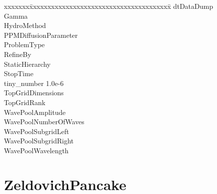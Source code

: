 \documentclass{book}
\begin{document}
{\parametersize
\begin{tabbing}
xxxxxxx\=xxxxxxxxxxxxxxxxxxxxxxxxxxxxxxxxxxxxxxx\=\kill
\> dtDataDump              \\
\> Gamma                   \\
\> HydroMethod             \\
\> PPMDiffusionParameter          \\
\> ProblemType                    \\
\> RefineBy                       \\
\> StaticHierarchy                \\
\> StopTime                \\
\> tiny\_number            \> 1.0e-6   \\
\> TopGridDimensions       \\
\> TopGridRank             \\
\> WavePoolAmplitude           \\
\> WavePoolNumberOfWaves   \\
\> WavePoolSubgridLeft          \\
\> WavePoolSubgridRight        \\
\> WavePoolWavelength          
\end{tabbing}}

\subsection{\cello}

\section{ZeldovichPancake} \label{s:ZeldovichPancake}

\subsection{\enzo}
\end{document}
